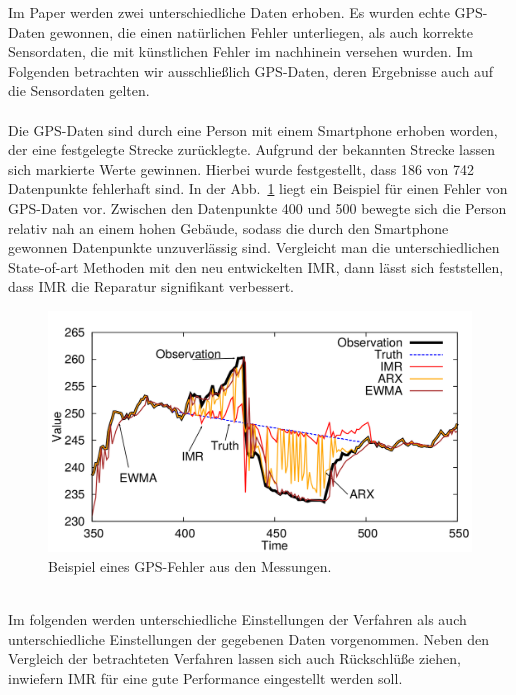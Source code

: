 Im Paper werden zwei unterschiedliche Daten erhoben. Es wurden echte GPS-Daten
gewonnen, die einen natürlichen Fehler unterliegen, als auch korrekte
Sensordaten, die mit künstlichen Fehler im nachhinein versehen wurden. Im
Folgenden betrachten wir ausschließlich GPS-Daten, deren Ergebnisse auch auf
die Sensordaten gelten.
\\\\
Die GPS-Daten sind durch eine Person mit einem Smartphone erhoben worden, der eine
festgelegte Strecke zurücklegte. Aufgrund der bekannten Strecke lassen sich
markierte Werte gewinnen. Hierbei wurde festgestellt, dass 186 von 742
Datenpunkte fehlerhaft sind. In der Abb.~\ref{gps} liegt ein Beispiel für einen
Fehler von GPS-Daten vor.  Zwischen den Datenpunkte 400 und 500 bewegte sich
die Person relativ nah an einem hohen Gebäude, sodass die durch den Smartphone
gewonnen Datenpunkte unzuverlässig sind. Vergleicht man die unterschiedlichen
State-of-art Methoden mit den neu entwickelten IMR, dann lässt sich
feststellen, dass IMR die Reparatur signifikant verbessert. 


\begin{figure}[htbp]
    \centering
    \includegraphics[width=\textwidth]{../plots/gps_example.png}
    \caption{Beispiel eines GPS-Fehler aus den Messungen.}%
    \label{gps}
\end{figure}
~\\
Im folgenden werden unterschiedliche Einstellungen der Verfahren als auch
unterschiedliche Einstellungen der gegebenen Daten vorgenommen. Neben den
Vergleich der betrachteten Verfahren lassen sich auch Rückschlüße ziehen,
inwiefern IMR für eine gute Performance eingestellt werden soll.

